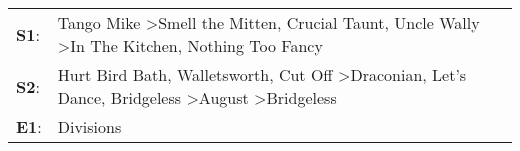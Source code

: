 \begin{supertabular}{p{0.03\textwidth}p{0.92\textwidth}}
 \textbf{S1}:  &                                                                      Tango Mike\textsuperscript{} \textgreater \enspace Smell the Mitten\textsuperscript{}, \enspace Crucial Taunt\textsuperscript{}, \enspace Uncle Wally\textsuperscript{} \textgreater \enspace In The Kitchen\textsuperscript{}, \enspace Nothing Too Fancy\textsuperscript{}  \enspace  \\
 \textbf{S2}:  &  Hurt Bird Bath\textsuperscript{}, \enspace Walletsworth\textsuperscript{}, \enspace Cut Off\textsuperscript{} \textgreater \enspace Draconian\textsuperscript{}, \enspace Let's Dance\textsuperscript{}, \enspace Bridgeless\textsuperscript{} \textgreater \enspace August\textsuperscript{} \textgreater \enspace Bridgeless\textsuperscript{}  \enspace  \\
 \textbf{E1}:  &                                                                                                                                                                                                                                                                                                                       Divisions\textsuperscript{}  \enspace  \\
\end{supertabular}
